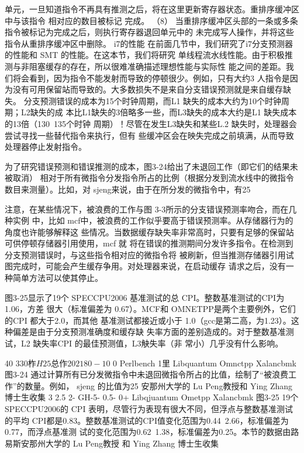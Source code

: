 单元，一旦知道指令不再具有推测之后，将在这里更新寄存器状态。重排序缓冲区中与该指令
相对应的数目被标记 完成。
（8） 当重排序缓冲区头部的一条或多条指令被标记为完成之后，则执行寄存器退回单元中的
未完成写人操作，并将这些指令从重排序缓冲区中删除。
i7的性能
在前面几节中，我们研究了i7分支预测器的性能和 SMT 的性能。在这本节，我们将研究
单线程流水线性能。由于积极推测与非阻塞缓存的存在，所以很难准确描述理想性能与实际性
能之间的差距。我们将会看到，因为指令不能发射而导致的停顿很少。例如，只有大约3%
人指令是因为没有可用保留站而导致的。大多数损失不是来自分支错误预测就是来自缓存缺失。
分支预测错误的成本为15个时钟周期，而L1 缺失的成本大约为10个时钟周期；L2缺失的成
本比L1缺失的3倍略多一些，而L3缺失的成本大约是L1 缺失成本的13倍（130~135个时钟
周期）！尽管在发生L3缺失和某些L.2 缺失时，处理器会尝试寻找一些替代指令来执行，但有
些缓冲区会在映失完成之前填满，从而导致处理器停止发射指令。

为了研究错误预测和错误推测的成本，图3-24给出了未退回工作（即它们的结果未被取消）
相对于所有微指令分发指令所占的比例（根据分发到流水线中的微指令数目来测量）。比如，对
sjeng来说，由于在所分发的微指令中，有25%

注意，在某些情况下，被浪费的工作与图 3-3所示的分支错误预测率吻合，而在几种实例
中，比如 mcf中，被浪费的工作似乎要高于错误预测率。从存储器行为的角度也许能够解释这
些情况。当数据缓存缺失率非常高时，只要有足够的保留站可供停顿存储器引用使用，mcf 就
将在错误的推测期间分发许多指令。在检测到分支预测错误时，与这些指令相对应的微指令将
被刷新，但当推测存储器引用试图完成时，可能会产生缓存争用。对处理器来说，在启动缓存
请求之后，没有一种简单方法可以使其停止。

图3-25显示了19个 SPECCPU2006 基准测试的总 CPI。整数基准测试的CPI为1.06，方差
很大（标准偏差为 0.67）。MCF和 OMNETPP是两个主要例外，它们的CPI 都大于2.0，而其他
基准测试都接近或小于 1.0（gcc是第二高，为1.23）。这种偏差是由于分支预测准确度和缓存缺
失率方面的差别造成的。对于整数基准测试，L2 缺失率CPI 的最佳预测值，L3觖失率（非
常小）几乎没有什么影响。

40%
3$%
30%
柞
H 25%
总
作 20%
2180-
10%
$%
0%
Perlbench
1里
Libquantum
Omnctpp
Xalancbmk
图3-24 通过计算所有已分发微指令中未退回微指令所占的比值，绘制了“被浪费工作”的数量。例如，
sjeng 的比值为25%
安那州大学的 Lu Peng教授和 Ying Zhang 博士生收集
3
2.5
2-
GH-5-
0.5-
0+
Libqjuantum
Ometpp
Xalancbmk
图3-25 19个 SPECCPU2006的 CPI 表明，尽管行为表现有很大不同，但浮点与整数基准测试的平均
CPI都是0.83。整数基准测试的CPI值变化范围为0.44~2.66，标准偏差为0.77，而浮点基准测
试的变化范围为0.62~1.38，标准偏差为0.25。本节的数据由路易斯安那州大学的 Lu Peng教授
和 Ying Zhang 博士生收集

